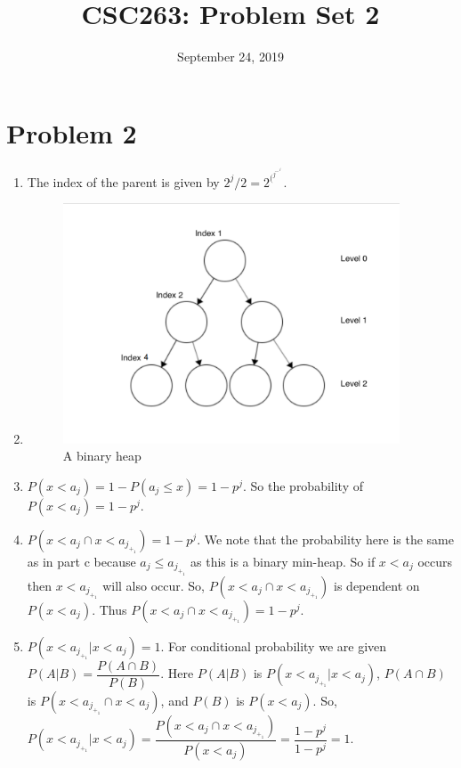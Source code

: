 \documentclass{article}
\title{CSC263: Problem Set 2}
\date{September 24, 2019}
\begin{document}
\maketitle

\section{Problem 2}

\begin{enumerate}[label=(\alph*)]

\item The index of the parent is given by $2^j / 2 = 2^(^j^-^1^)$.

\item \begin{figure}[htp]
    \centering
    \includegraphics[width=10cm]{PSet2.png}
    \caption{A binary heap}
    \label{fig:heap}
\end{figure}

\item $P (x < a_j) = 1 - P(a_j \leq x) = 1 - p^j$. So the probability of $P(x < a_j) = 1 - p^j$.

\item $P(x < a_j \cap x < a_j_+_1) = 1 - p^j$. We note that the probability here is the same as in part c because $a_j \leq a_j_+_1$ as this is a binary min-heap. So if $x < a_j$ occurs then $x < a_j_+_1$ will also occur. So, $P(x < a_j \cap x < a_j_+_1)$ is dependent on $P (x < a_j)$. Thus $P(x < a_j \cap x < a_j_+_1) = 1 - p^j$.

\item $P(x < a_j_+_1 | x < a_j) = 1$. For conditional probability we are given $P(A|B) = \dfrac{P(A \cap B)}{P(B)}$. Here $P(A|B)$ is $P(x < a_j_+_1 | x < a_j)$, $P(A \cap B)$ is $P(x < a_j_+_1 \cap x < a_j)$, and $P(B)$ is $P(x < a_j)$. So, $P(x < a_j_+_1 | x < a_j) = \dfrac{P(x < a_j \cap x < a_j_+_1)}{P (x < a_j)} = \dfrac{1-p^j}{1 - p^j} = 1$.


\end{enumerate}
\end{document}
